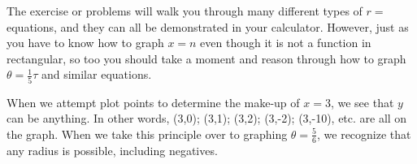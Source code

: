 The exercise or problems will walk you through many different types of $r=$ equations, and they
can all be demonstrated in your calculator.  However, just as you have to know how to graph
$x=n$ even though it is not a function in rectangular, so too you should take a moment and reason
through how to graph $\theta=\frac{1}{5}\tau$ and similar equations. 

When we attempt plot points to determine the make-up of $x=3$, we see that $y$ can be anything.
In other words, (3,0); (3,1); (3,2); (3,-2); (3,-10), etc. are all on the graph.  When we take this principle
over to graphing $\theta=\frac{5}{6}$, we recognize that any radius is possible, including negatives.
~\vfill

